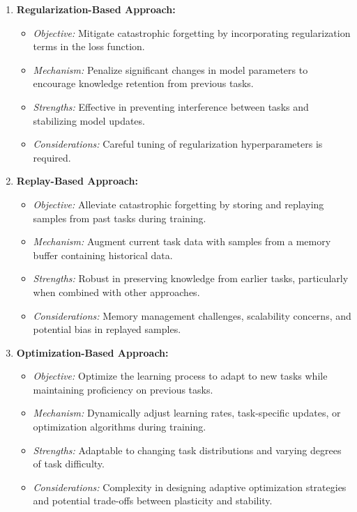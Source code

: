 \documentclass[12pt,a4paper]{article}
\begin{document}
\begin{enumerate}
	\item \textbf{Regularization-Based Approach:}
	\begin{itemize}
		\item \textit{Objective:} Mitigate catastrophic forgetting by incorporating regularization terms in the loss function.
		\item \textit{Mechanism:} Penalize significant changes in model parameters to encourage knowledge retention from previous tasks.
		\item \textit{Strengths:} Effective in preventing interference between tasks and stabilizing model updates.
		\item \textit{Considerations:} Careful tuning of regularization hyperparameters is required.
	\end{itemize}
	
	\item \textbf{Replay-Based Approach:}
	\begin{itemize}
		\item \textit{Objective:} Alleviate catastrophic forgetting by storing and replaying samples from past tasks during training.
		\item \textit{Mechanism:} Augment current task data with samples from a memory buffer containing historical data.
		\item \textit{Strengths:} Robust in preserving knowledge from earlier tasks, particularly when combined with other approaches.
		\item \textit{Considerations:} Memory management challenges, scalability concerns, and potential bias in replayed samples.
	\end{itemize}
	
	\item \textbf{Optimization-Based Approach:}
	\begin{itemize}
		\item \textit{Objective:} Optimize the learning process to adapt to new tasks while maintaining proficiency on previous tasks.
		\item \textit{Mechanism:} Dynamically adjust learning rates, task-specific updates, or optimization algorithms during training.
		\item \textit{Strengths:} Adaptable to changing task distributions and varying degrees of task difficulty.
		\item \textit{Considerations:} Complexity in designing adaptive optimization strategies and potential trade-offs between plasticity and stability.
	\end{itemize}
	

\end{enumerate}
\end{document}
